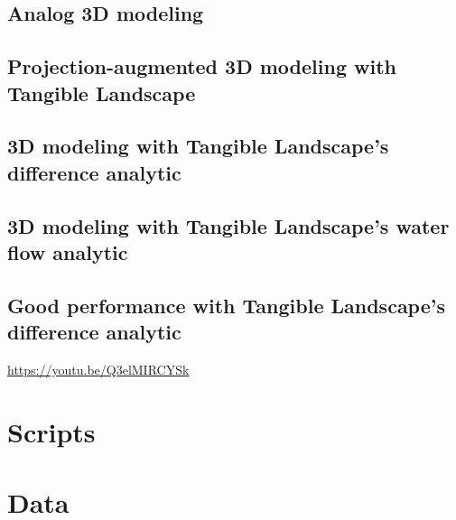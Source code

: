 \documentclass[prodmode,acmtochi]{acmsmall} %
\begin{document}
\subsection{Analog 3D modeling}\label{videos:analog}

\subsection{Projection-augmented 3D modeling with Tangible Landscape}\label{videos:augmented}

\subsection{3D modeling with Tangible Landscape's difference analytic}\label{videos:difference}

\subsection{3D modeling with Tangible Landscape's water flow analytic}\label{videos:water}

\subsection{Good performance with Tangible Landscape's difference analytic}\label{videos:new_difference}
\url{https://youtu.be/Q3elMIRCYSk}

\vfill

\clearpage

\section{Scripts}\label{appendix:scripts}



\vfill

\clearpage

\section{Data}\label{appendix:data}


\vfill
\end{document}
